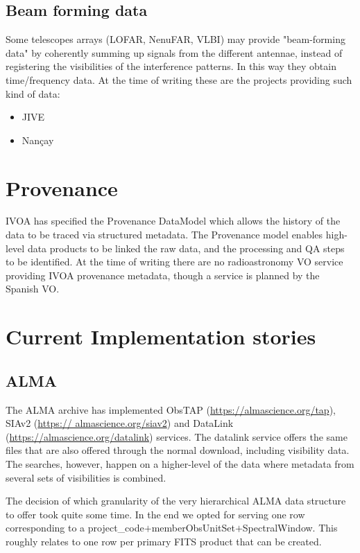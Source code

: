 \documentclass[11pt,a4paper]{ivoa}
\begin{document}
\subsection{Beam forming data}
Some telescopes arrays (LOFAR, NenuFAR, VLBI) may provide "beam-forming data" by coherently summing up 
signals from the different antennae, instead of registering the visibilities of the interference 
patterns. In this way they obtain time/frequency data. At the time of writing these are the projects 
providing such kind of data:
\begin{itemize}
\item JIVE
\item Nan\c cay
\end{itemize}
\section{Provenance}

IVOA has specified the Provenance DataModel \citep{2020ivoa.spec.0411S} which allows the history of the 
data to be traced via structured metadata. The Provenance model enables high-level data products to be 
linked the raw data, and the processing and QA steps to be identified. At the time of writing there are 
no radioastronomy VO service providing IVOA provenance metadata, though a service is planned by the 
Spanish VO.   

%



\appendix
\section{ Current Implementation stories}

\subsection{ALMA}
\label{sec:ALMA}
The ALMA archive has implemented ObsTAP (\url{https://almascience.org/tap}), SIAv2 (\url{https://
almascience.org/siav2}) and DataLink (\url{https://almascience.org/datalink}) services.
The datalink service offers the same files that are also offered through the normal download, including 
visibility data. The searches, however, happen on a higher-level of the data where metadata from several 
sets of visibilities is combined.

The decision of which granularity of the very hierarchical ALMA data
structure to offer took quite some time. In the end we opted for serving
one row corresponding to a project\_code$+$memberObsUnitSet$+$SpectralWindow. This roughly relates to 
one row per primary FITS product that can be created.
\end{document}
